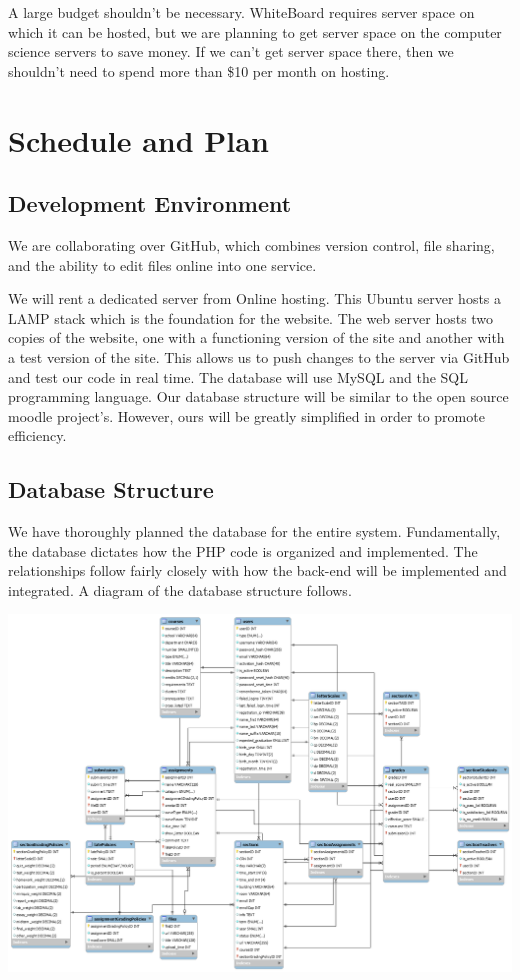 \documentclass{article}
\begin{document}
A large budget shouldn't be necessary. WhiteBoard requires server space on
which it can be hosted, but we are planning to get server space on the computer
science servers to save money. If we can't get server space there, then we
shouldn't need to spend more than \$10 per month on hosting.

\section{Schedule and Plan}

\subsection{Development Environment}

We are collaborating over GitHub, which combines version control, file sharing,
and the ability to edit files online into one service.

We will rent a dedicated server from Online hosting. This Ubuntu server hosts a
LAMP stack which is the foundation for the website. The web server hosts two
copies of the website, one with a functioning version of the site and another
with a test version of the site. This allows us to push changes to the server
via GitHub and test our code in real time. The database will use MySQL and the
SQL programming language. Our database structure will be similar to the open
source moodle project's. However, ours will be greatly simplified in order to
promote efficiency.

\subsection{Database Structure}

We have thoroughly planned the database for the entire system. Fundamentally,
the database dictates how the PHP code is organized and implemented. The
relationships follow fairly closely with how the back-end will be implemented
and integrated. A diagram of the database structure follows.

\includegraphics[width=6.5 in]{db}
\end{document}
